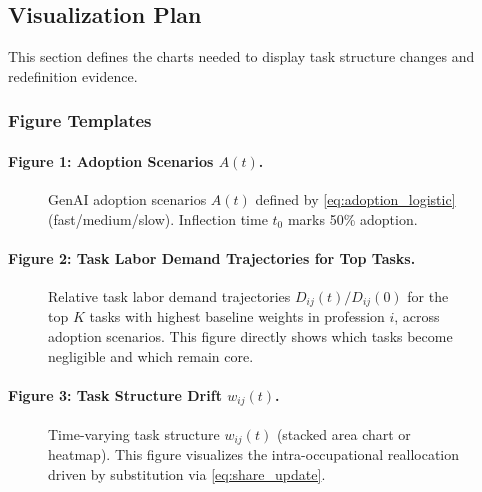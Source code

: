 \subsection{Visualization Plan}
\label{sec:viz_plan}
This section defines the charts needed to display task structure changes and redefinition evidence.

\subsubsection{Figure Templates}
\label{sec:fig_templates}

\paragraph{Figure 1: Adoption Scenarios $A(t)$.}
\begin{figure}[ht]
\centering
\caption{GenAI adoption scenarios $A(t)$ defined by \eqref{eq:adoption_logistic} (fast/medium/slow). Inflection time $t_0$ marks 50\% adoption.}
\label{fig:adoption}
\end{figure}

\paragraph{Figure 2: Task Labor Demand Trajectories for Top Tasks.}
\begin{figure}[ht]
\centering
\caption{Relative task labor demand trajectories $D_{ij}(t)/D_{ij}(0)$ for the top $K$ tasks with highest baseline weights in profession $i$, across adoption scenarios. This figure directly shows which tasks become negligible and which remain core.}
\label{fig:task_demand_top}
\end{figure}

\paragraph{Figure 3: Task Structure Drift $w_{ij}(t)$.}
\begin{figure}[ht]
\centering
\caption{Time-varying task structure $w_{ij}(t)$ (stacked area chart or heatmap). This figure visualizes the intra-occupational reallocation driven by substitution via \eqref{eq:share_update}.}
\label{fig:task_structure}
\end{figure}

